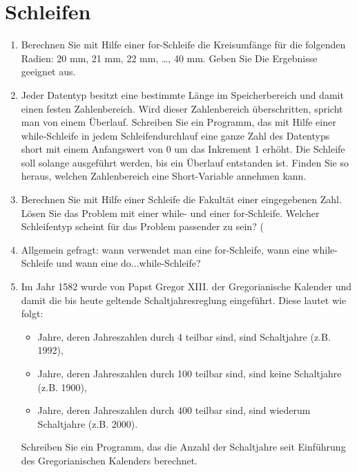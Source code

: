 \documentclass[paper=a4, fontsize=11pt, twoside]{scrartcl}
\begin{document}
\section*{Schleifen}
\begin{enumerate}[resume]
  \item Berechnen Sie mit Hilfe einer for-Schleife die Kreisumfänge für die folgenden Radien: 20 mm, 21 mm, 22 mm, \dots, 40 mm. Geben Sie Die Ergebnisse geeignet aus.
  \item Jeder Datentyp besitzt eine bestimmte Länge im Speicherbereich und damit einen festen Zahlenbereich. Wird dieser Zahlenbereich überschritten, spricht man von einem Überlauf. Schreiben Sie ein Programm, das mit Hilfe einer while-Schleife in jedem Schleifendurchlauf eine ganze Zahl des Datentyps short mit einem Anfangswert von 0 um das Inkrement 1 erhöht. Die Schleife soll solange ausgeführt werden, bis ein Überlauf entstanden ist. Finden Sie so heraus, welchen Zahlenbereich eine Short-Variable annehmen kann.
  \item Berechnen Sie mit Hilfe einer Schleife die Fakultät einer eingegebenen Zahl. Lösen Sie das Problem mit einer while- und einer for-Schleife. Welcher Schleifentyp scheint für das Problem passender zu sein? (
  \item Allgemein gefragt: wann verwendet man eine for-Schleife, wann eine while-Schleife und wann eine do...while-Schleife?
 \item Im Jahr 1582 wurde von  Papst Gregor XIII. der Gregorianische Kalender und damit die bis heute geltende Schaltjahresreglung eingeführt. Diese lautet wie folgt:
   \begin{itemize}
   \item Jahre, deren Jahreszahlen durch 4 teilbar sind, sind Schaltjahre (z.B. 1992), 
   \item Jahre, deren Jahreszahlen durch 100 teilbar sind, sind keine Schaltjahre (z.B. 1900), 
   \item Jahre, deren Jahreszahlen durch 400 teilbar sind, sind wiederum Schaltjahre (z.B. 2000).
   \end{itemize}
   Schreiben Sie ein Programm, das die Anzahl der Schaltjahre seit Einführung des Gregorianischen Kalenders berechnet.
\end{enumerate}
\end{document}

